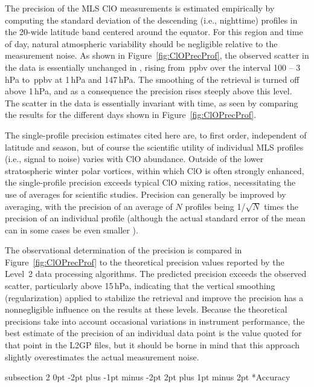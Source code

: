 \documentclass[11pt,draft]{report}
\makeatletter
\renewcommand{\subsection}{\@startsection%
  {subsection}%
  {2}%
  {0pt}%
  {-2pt plus -1pt minus -2pt}%
  {2pt plus 1pt minus 2pt}%
  {\large\sffamily\fontseries{sb}\selectfont\flushleft\color{SectionColor}\figureversion{tabular}}}%
\makeatother
\begin{document}
The precision of the MLS ClO measurements is estimated empirically by
computing the standard deviation of the descending (i.e., nighttime)
profiles in the 20{\degsym}-wide latitude band centered around the
equator.  For this region and time of day, natural atmospheric
variability should be negligible relative to the measurement noise.
As shown in Figure~\ref{fig:ClOPrecProf}, the observed scatter in the
data is essentially unchanged in \thisv, rising from
\,ppbv over the interval 100 -- 3\,hPa to
\,ppbv at 1\,hPa and 147\,hPa.  The smoothing of the
retrieval is turned off above 1\,hPa, and as a consequence the
precision rises steeply above this level.  The scatter in the data is
essentially invariant with time, as seen by comparing the results for
the different days shown in Figure~\ref{fig:ClOPrecProf}.

The single-profile precision estimates cited here are, to first order,
independent of latitude and season, but of course the scientific
utility of individual MLS profiles (i.e., signal to noise) varies with
ClO abundance.  Outside of the lower stratospheric winter polar
vortices, within which ClO is often strongly enhanced, the
single-profile precision exceeds typical ClO mixing ratios,
necessitating the use of averages for scientific studies.  Precision
can generally be improved by averaging, with the precision of an
average of $N$ profiles being 1/$\sqrt{N}$ times the precision of an
individual profile (although the actual standard error of the mean can
in some cases be even smaller \citep{TooheyAndVonClarmann13}).

The observational determination of the precision is compared in
Figure~\ref{fig:ClOPrecProf} to the theoretical precision values
reported by the Level~2 data processing algorithms.  The predicted
precision exceeds the observed scatter, particularly above 15\,hPa,
indicating that the vertical smoothing (regularization) applied to
stabilize the retrieval and improve the precision has a nonnegligible
influence on the results at these levels.  Because the theoretical
precisions take into account occasional variations in instrument
performance, the best estimate of the precision of an individual data
point is the value quoted for that point in the L2GP files, but it
should be borne in mind that this approach slightly overestimates the
actual measurement noise.

\subsection*{Accuracy}
\end{document}
